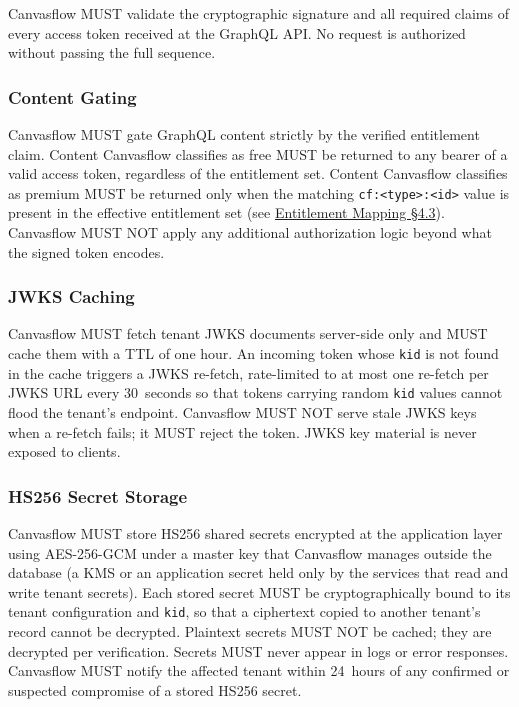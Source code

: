 Canvasflow MUST validate the cryptographic signature and all required claims of every
access token received at the GraphQL API. 
No request is authorized without passing the full sequence.

\subsubsection{Content Gating}

Canvasflow MUST gate GraphQL content strictly by the verified entitlement claim. Content
Canvasflow classifies as free MUST be returned to any bearer of a valid access token,
regardless of the entitlement set. Content Canvasflow classifies as premium MUST be
returned only when the matching \texttt{cf:<type>:<id>} value is present in the
effective entitlement set (see \hyperref[sec:claim-name-hierarchy]{Entitlement Mapping \S4.3}). 
Canvasflow MUST NOT apply any additional authorization logic beyond 
what the signed token encodes.

\subsubsection{JWKS Caching}

Canvasflow MUST fetch tenant JWKS documents server-side only and MUST cache them with a
TTL of one hour. An incoming token whose \texttt{kid} is not found in the cache triggers
a JWKS re-fetch, rate-limited to at most one re-fetch per JWKS URL every 30~seconds so
that tokens carrying random \texttt{kid} values cannot flood the tenant's endpoint.
Canvasflow MUST NOT serve stale JWKS keys when a re-fetch fails; it MUST reject the
token. JWKS key material is never exposed to clients.

\subsubsection{HS256 Secret Storage}

Canvasflow MUST store HS256 shared secrets encrypted at the application layer using
AES-256-GCM under a master key that Canvasflow manages outside the database (a KMS or
an application secret held only by the services that read and write tenant secrets).
Each stored secret MUST be cryptographically bound to its tenant configuration and
\texttt{kid}, so that a ciphertext copied to another tenant's record cannot be
decrypted. Plaintext secrets MUST NOT be cached; they are decrypted per verification.
Secrets MUST never appear in logs or error responses. Canvasflow MUST notify the affected tenant within 24~hours of any confirmed
or suspected compromise of a stored HS256 secret.

